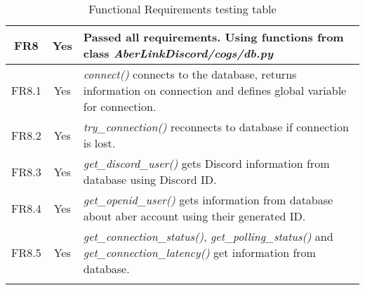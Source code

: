 \begin{longtable}{| c | c | p{10cm} |}
\hline
FR8 & \color{ForestGreen}Yes & Passed all requirements. Using functions from class \textit{AberLinkDiscord/cogs/db.py}\\
\hline
FR8.1 & \color{ForestGreen}Yes & \textit{connect()} connects to the database, returns information on connection and defines global variable for connection.\\
\hline
FR8.2 & \color{ForestGreen}Yes & \textit{try\_connection()} reconnects to database if connection is lost.\\
\hline
FR8.3 & \color{ForestGreen}Yes & \textit{get\_discord\_user()} gets Discord information from database using Discord ID.\\
\hline
FR8.4 & \color{ForestGreen}Yes & \textit{get\_openid\_user()} gets information from database about aber account using their generated ID.\\
\hline
FR8.5 & \color{ForestGreen}Yes & \textit{get\_connection\_status()}, \textit{get\_polling\_status()} and \textit{get\_connection\_latency()} get information from database.\\
\hline

\caption{Functional Requirements testing table}
\label{tab:fr-test}
\end{longtable}
